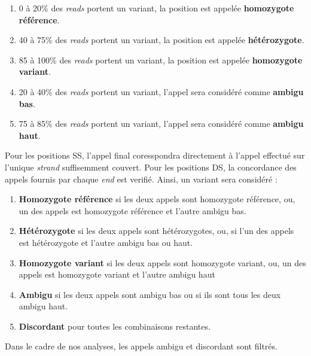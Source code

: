 \documentclass[12pt,twoside]{reedthesis}
\providecommand{\tightlist}{%
  \setlength{\itemsep}{0pt}\setlength{\parskip}{0pt}}
\theoremstyle{definition}
\theoremstyle{definition}
\theoremstyle{remark}
\begin{document}
  \begin{enumerate}
  \def\labelenumi{\arabic{enumi}.}
  \tightlist
  \item
    0 à 20\% des \emph{reads} portent un variant, la position est appelée
    \textbf{homozygote référence}.\\
  \item
    40 à 75\% des \emph{reads} portent un variant, la position est appelée
    \textbf{hétérozygote}.\\
  \item
    85 à 100\% des \emph{reads} portent un variant, la position est
    appelée \textbf{homozygote variant}.\\
  \item
    20 à 40\% des \emph{reads} portent un variant, l'appel sera considéré
    comme \textbf{ambigu bas}.\\
  \item
    75 à 85\% des \emph{reads} portent un variant, l'appel sera considéré
    comme \textbf{ambigu haut}.
  \end{enumerate}
  
  Pour les positions SS, l'appel final coresspondra directement à l'appel
  effectué sur l'unique \emph{strand} suffisemment couvert. Pour les
  positions DS, la concordance des appels fournis par chaque \emph{end}
  est verifié. Ainsi, un variant sera considéré :
  
  \begin{enumerate}
  \def\labelenumi{\arabic{enumi}.}
  \tightlist
  \item
    \textbf{Homozygote référence} si les deux appels sont homozygote
    référence, ou, un des appels est homozygote référence et l'autre
    ambigu bas.
  \item
    \textbf{Hétérozygote} si les deux appels sont hétérozygotes, ou, si
    l'un des appels est hétérozygote et l'autre ambigu bas ou haut.\\
  \item
    \textbf{Homozygote variant} si les deux appels sont homozygote
    variant, ou, un des appels est homozygote variant et l'autre ambigu
    haut
  \item
    \textbf{Ambigu} si les deux appels sont ambigu bas ou si ils sont tous
    les deux ambigu haut.\\
  \item
    \textbf{Discordant} pour toutes les combinaisons restantes.
  \end{enumerate}
  
  Dans le cadre de nos analyses, les appels ambigu et discordant sont
  filtrés.
  
\end{document}
